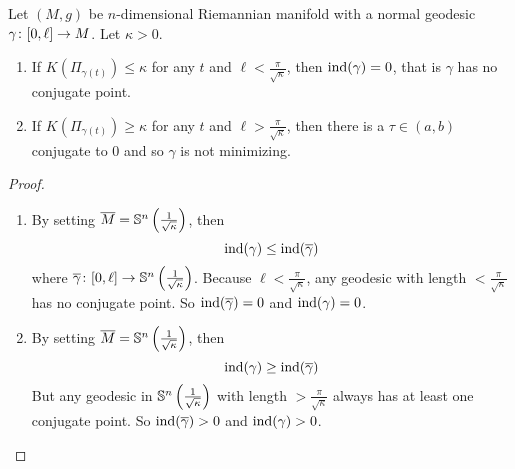 \begin{enumerate}[label=\arabic{*}.]
	\begin{cor}
		Let $(M,g)$ be $n$-dimensional Riemannian manifold with a normal geodesic $\gamma \colon [0,\ell] \rightarrow M$. Let $\kappa > 0$.
		\begin{enumerate}[label=(\arabic{*})]
			\item If $K(\Pi_{\gamma(t)}) \leq \kappa$ for any $t$ and $\ell < \frac{\pi}{\sqrt{\kappa}}$, then $\operatorname{ind}(\gamma) = 0$, that is $\gamma$ has no conjugate point.
			\item If $K(\Pi_{\gamma(t)}) \geq \kappa$ for any $t$ and $\ell > \frac{\pi}{\sqrt{\kappa}}$, then there is a $\tau \in (a,b)$ conjugate to $0$ and so $\gamma$ is not minimizing.
		\end{enumerate}
	\end{cor}
	\begin{proof}
		\begin{enumerate}[label=(\arabic{*})]
			\item By setting $\overline{M} = \mathbb{S}^n\left(\frac{1}{\sqrt{\kappa}}\right)$, then
			\begin{equation*}
				\operatorname{ind}(\gamma)\leq\operatorname{ind}(\overline{\gamma})
			\end{equation*}
			where $\overline{\gamma} \colon [0,\ell] \rightarrow \mathbb{S}^n\left(\frac{1}{\sqrt{\kappa}}\right)$. Because $\ell < \frac{\pi}{\sqrt{\kappa}}$, any geodesic with length $< \frac{\pi}{\sqrt{\kappa}}$ has no conjugate point. So $\operatorname{ind}(\overline{\gamma}) = 0$ and $\operatorname{ind}(\gamma) = 0$.

			\item By setting $\overline{M} = \mathbb{S}^n\left(\frac{1}{\sqrt{\kappa}}\right)$, then
			\begin{equation*}
				\operatorname{ind}(\gamma)\geq\operatorname{ind}(\overline{\gamma})
			\end{equation*}
			But any geodesic in $\mathbb{S}^n\left(\frac{1}{\sqrt{\kappa}}\right)$ with length $> \frac{\pi}{\sqrt{\kappa}}$ always has at least one conjugate point. So $\operatorname{ind}(\overline{\gamma}) > 0$ and $\operatorname{ind}(\gamma) > 0$. \qedhere
		\end{enumerate}
	\end{proof}


\end{enumerate}
